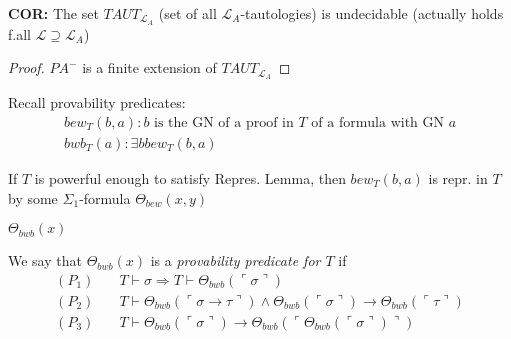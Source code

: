 \documentclass[12pt]{article}
\newcommand{\proves}{\vdash}
\newcommand{\gn}[1]{\ulcorner #1 \urcorner}
\begin{document}
\textbf{COR:} The set $TAUT_{\mathcal{L}_A}$
(set of all $\mathcal{L}_A$-tautologies) is undecidable
(actually holds f.all $\mathcal{L} \supseteq \mathcal{L}_A$)
\begin{proof}
  $PA^-$ is a finite extension of $TAUT_{\mathcal{L}_A}$
\end{proof}


Recall provability predicates:
\begin{align*}
  bew_T(b,a): b \text{ is the GN of a proof in $T$ of a formula with GN } a \\
  bwb_T(a): \exists b bew_T(b,a)
\end{align*}

If $T$ is powerful enough to satisfy Repres. Lemma,
then $bew_T(b,a)$ is repr. in $T$ by some
$\Sigma_1$-formula $\Theta_{bew}(x,y)$

$\Theta_{bwb}(x)$


We say that $\Theta_{bwb}(x)$ is a \emph{provability predicate for $T$}
if
\begin{align*}
  (P_1)& \quad 
  T \proves \sigma \Rightarrow T \proves \Theta_{bwb}(\gn{\sigma}) \\
  (P_2)& \quad
  T \proves \Theta_{bwb}(\gn{\sigma \rightarrow \tau}) \wedge
        \Theta_{bwb}(\gn{\sigma}) \rightarrow \Theta_{bwb}(\gn{\tau}) \\
  (P_3)& \quad
  T \proves \Theta_{bwb}(\gn{\sigma}) \rightarrow 
        \Theta_{bwb}(\gn{\Theta_{bwb}(\gn{\sigma})})
\end{align*}
\end{document}
